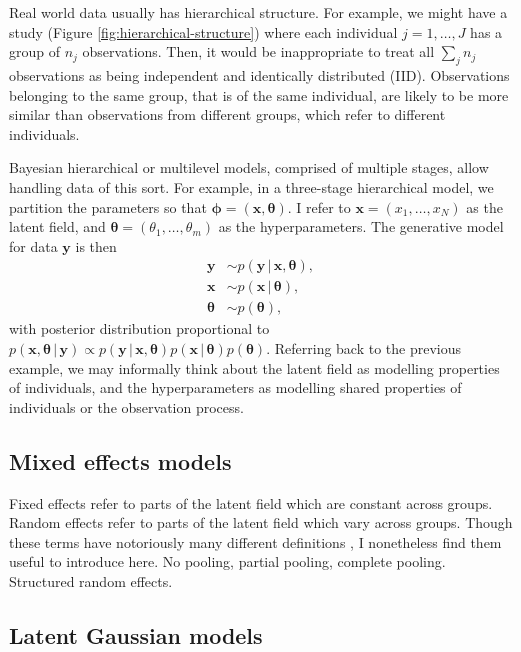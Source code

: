 \documentclass[a4paper, nobind]{templates/ociamthesis}
\newcommand{\x}{\mathbf{x}}
\newcommand{\y}{\mathbf{y}}
\newcommand{\bphi}{\bm{\phi}}
\newcommand{\btheta}{\bm{\theta}}
\begin{document}
Real world data usually has hierarchical structure.
For example, we might have a study (Figure \ref{fig:hierarchical-structure}) where each individual \(j = 1, \ldots, J\) has a group of \(n_j\) observations.
Then, it would be inappropriate to treat all \(\sum_j n_j\) observations as being independent and identically distributed (IID).
Observations belonging to the same group, that is of the same individual, are likely to be more similar than observations from different groups, which refer to different individuals.

Bayesian hierarchical or multilevel models, comprised of multiple stages, allow handling data of this sort.
For example, in a three-stage hierarchical model, we partition the parameters so that \(\bphi = (\x, \btheta)\).
I refer to \(\x = (x_1, \ldots, x_N)\) as the latent field, and \(\btheta = (\theta_1, \ldots, \theta_m)\) as the hyperparameters.
The generative model for data \(\y\) is then
\begin{align}
\y &\sim p(\y \, | \, \x, \btheta), \\
\x &\sim p(\x \, | \, \btheta), \\
\btheta &\sim p(\btheta),
\end{align}
with posterior distribution proportional to \(p(\x, \btheta \, | \, \y) \propto p(\y \, | \, \x, \btheta) p(\x \, | \, \btheta) p(\btheta)\).
Referring back to the previous example, we may informally think about the latent field as modelling properties of individuals, and the hyperparameters as modelling shared properties of individuals or the observation process.

\hypertarget{mixed-effects-models}{%
\subsection{Mixed effects models}\label{mixed-effects-models}}

Fixed effects refer to parts of the latent field which are constant across groups.
Random effects refer to parts of the latent field which vary across groups.
Though these terms have notoriously many different definitions \autocite{gelman2005analysis}, I nonetheless find them useful to introduce here.
No pooling, partial pooling, complete pooling.
Structured random effects.

\hypertarget{latent-gaussian-models}{%
\subsection{Latent Gaussian models}\label{latent-gaussian-models}}
\end{document}
